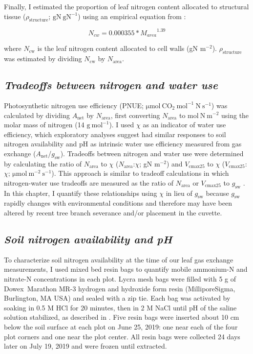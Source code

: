 Finally, I estimated the proportion of leaf nitrogen content allocated to structural tissue ($\rho_\mathrm{structure}$; $\mathrm{gN\ gN^{-1}}$) using an empirical equation from :

\begin{equation} \label{eqn_2.14}
    N_{cw}=0.000355*{M_{area}}^{1.39}
\end{equation}
    
\noindent where $N_\mathrm{cw}$ is the leaf nitrogen content allocated to cell walls (gN m$^{-2}$). $\rho_\mathrm{structure}$ was estimated by dividing $N_\mathrm{cw}$ by $N_\mathrm{area}$.

\subsection{\textit{Tradeoffs between nitrogen and water use}}
\noindent Photosynthetic nitrogen use efficiency (PNUE; $\mathrm{\mu mol\ CO_2\ mol^{-1}\ N\ s^{-1}}$) was calculated by dividing $A_\mathrm{net}$ by $N_\mathrm{area}$, first converting $N_\mathrm{area}$ to $\mathrm{mol\ N\ m^{-2}}$ using the molar mass of nitrogen (14 $\mathrm{g\ mol^{-1}}$). I used $\chi$ as an indicator of water use efficiency, which exploratory analyses suggest had similar responses to soil nitrogen availability and pH as intrinsic water use efficiency measured from gas exchange ($A_\mathrm{net}$/$g_\mathrm{sw}$). Tradeoffs between nitrogen and water use were determined by calculating the ratio of $N_\mathrm{area}$ to $\chi$ ($N_\mathrm{area}$:$\chi$; gN m$^{-2}$) and $V_\mathrm{cmax25}$ to $\chi$ ($V_\mathrm{cmax25}$:$\chi$; $\mathrm{\mu mol\ m^{-2}\ s^{-1}}$). This approach is similar to tradeoff calculations in which nitrogen-water use tradeoffs are measured as the ratio of $N_\mathrm{area}$ or $V_\mathrm{cmax25}$ to $g_\mathrm{sw}$ . In this chapter, I quantify these relationships using $\chi$ in lieu of $g_\mathrm{sw}$ because $g_\mathrm{sw}$ rapidly changes with environmental conditions and therefore may have been altered by recent tree branch severance and/or placement in the cuvette.

\subsection{\textit{Soil nitrogen availability and pH}}
\noindent To characterize soil nitrogen availability at the time of our leaf gas exchange measurements, I used mixed bed resin bags to quantify mobile ammonium-N and nitrate-N concentrations in each plot. Lycra mesh bags were filled with 5 g of Dowex\textregistered\ Marathon MR-3 hydrogen and hydroxide form resin (MilliporeSigma, Burlington, MA USA) and sealed with a zip tie. Each bag was activated by soaking in 0.5 M HCl for 20 minutes, then in 2 M NaCl until pH of the saline solution stabilized, as described in . Five resin bags were inserted about 10 cm below the soil surface at each plot on June 25, 2019: one near each of the four plot corners and one near the plot center. All resin bags were collected 24 days later on July 19, 2019 and were frozen until extracted.
    
